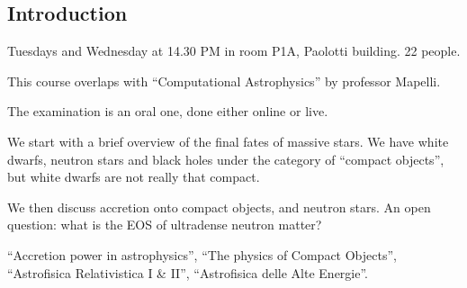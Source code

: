 \documentclass[main.tex]{subfiles}
\begin{document}

\subsection*{Introduction}

Tuesdays and Wednesday at 14.30 PM in room P1A, Paolotti building.
22 people. 

This course overlaps with ``Computational Astrophysics'' by professor Mapelli.

The examination is an oral one, done either online or live. 

We start with a brief overview of the final fates of massive stars. 
We have white dwarfs, neutron stars and black holes under the category of ``compact objects'', but white dwarfs are not really that compact. 

We then discuss accretion onto compact objects, and neutron stars.  
An open question: what is the EOS of ultradense neutron matter?

``Accretion power in astrophysics'', ``The physics of Compact Objects'', ``Astrofisica Relativistica I \& II'', ``Astrofisica delle Alte Energie''.
\end{document}
